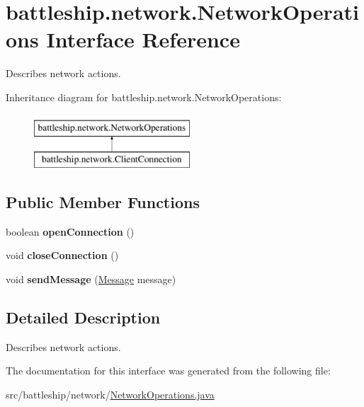 \hypertarget{interfacebattleship_1_1network_1_1NetworkOperations}{}\section{battleship.\+network.\+Network\+Operations Interface Reference}
\label{interfacebattleship_1_1network_1_1NetworkOperations}


Describes network actions.  


Inheritance diagram for battleship.\+network.\+Network\+Operations\+:\begin{figure}[H]
\begin{center}
\leavevmode
\includegraphics[height=2.000000cm]{interfacebattleship_1_1network_1_1NetworkOperations}
\end{center}
\end{figure}
\subsection*{Public Member Functions}
\begin{DoxyCompactItemize}
\item 
\hypertarget{interfacebattleship_1_1network_1_1NetworkOperations_aa554817e304e25a1737f392ea6a526d7}{}boolean {\bfseries open\+Connection} ()\label{interfacebattleship_1_1network_1_1NetworkOperations_aa554817e304e25a1737f392ea6a526d7}

\item 
\hypertarget{interfacebattleship_1_1network_1_1NetworkOperations_af39bfd58b56ecca9d09f8a4d3b49e6ff}{}void {\bfseries close\+Connection} ()\label{interfacebattleship_1_1network_1_1NetworkOperations_af39bfd58b56ecca9d09f8a4d3b49e6ff}

\item 
\hypertarget{interfacebattleship_1_1network_1_1NetworkOperations_a58ed9cf94c23fc71c757398c800393bb}{}void {\bfseries send\+Message} (\hyperlink{classbattleship_1_1game_1_1Message}{Message} message)\label{interfacebattleship_1_1network_1_1NetworkOperations_a58ed9cf94c23fc71c757398c800393bb}

\end{DoxyCompactItemize}


\subsection{Detailed Description}
Describes network actions. 

The documentation for this interface was generated from the following file\+:\begin{DoxyCompactItemize}
\item 
src/battleship/network/\hyperlink{NetworkOperations_8java}{Network\+Operations.\+java}\end{DoxyCompactItemize}
